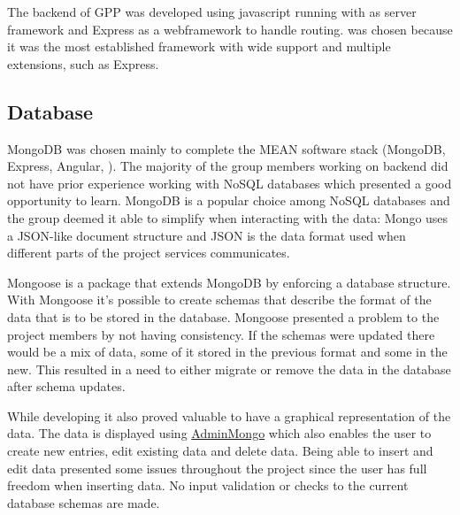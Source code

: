 
The backend of GPP was developed using javascript running with \nodejs{} as server framework and Express as a webframework to handle routing. \nodejs{} was chosen because it was the most established framework with wide support and multiple extensions, such as Express.

\subsection{Database} \label{database}


MongoDB was chosen mainly to complete the MEAN software stack (MongoDB, Express, Angular, \nodejs{}). The majority of the group members working on backend did not have prior experience working with NoSQL databases which presented a good opportunity to learn. MongoDB is a popular choice among NoSQL databases and the group deemed it able to simplify when interacting with the data: Mongo uses a JSON-like document structure and JSON is the data format used when different parts of the project services communicates.

Mongoose is a package that extends MongoDB by enforcing a database structure. With Mongoose it's possible to create schemas that describe the format of the data that is to be stored in the database. Mongoose presented a problem to the project members by not having consistency. If the schemas were updated there would be a mix of data, some of it stored in the previous format and some in the new. This resulted in a need to either migrate or remove the data in the database after schema updates.

While developing it also proved valuable to have a graphical representation of the data. The data is displayed using \href{https://github.com/mrvautin/adminMongo}{AdminMongo} which also enables the user to create new entries, edit existing data and delete data. Being able to insert and edit data presented some issues throughout the project since the user has full freedom when inserting data. No input validation or checks to the current database schemas are made.



